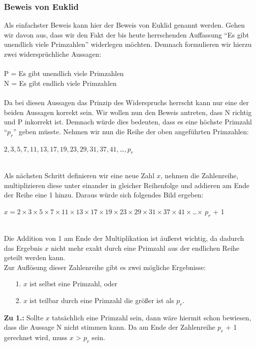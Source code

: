 \documentclass[german,12pt,a4paper]{article}
\begin{document}
\subsubsection{Beweis von Euklid}
Als einfachster Beweis kann hier der Beweis von Euklid genannt werden. Gehen wir davon aus, dass wir den Fakt der bis heute herrschenden Auffassung “Es gibt unendlich viele Primzahlen” widerlegen möchten. Demnach formulieren wir hierzu zwei widersprüchliche Aussagen:\\\\
\hspace*{20mm}P = Es gibt unendlich viele Primzahlen\\
\hspace*{20mm}N = Es gibt endlich viele Primzahlen\\
\\Da bei diesen Aussagen das Prinzip des Widerspruchs herrscht kann nur eine der beiden Aussagen korrekt sein. Wir wollen nun den Beweis antreten, dass N richtig und P inkorrekt ist. Demnach würde dies bedeuten, dass es eine höchste Primzahl “$p_r$” geben müsste. Nehmen wir nun die Reihe der oben angeführten Primzahlen:\\
\begin{center}
$2, 3, 5, 7, 11, 13, 17, 19, 23, 29, 31, 37, 41, $…$, p_r$
\end{center}\
\\Als nächsten Schritt definieren wir eine neue Zahl $x$, nehmen die Zahlenreihe, multiplizieren diese unter einander in gleicher Reihenfolge und addieren am Ende der Reihe eine 1 hinzu. Daraus würde sich folgendes Bild ergeben:\\
\begin{center}
$x = 2\times3\times5\times7\times11\times13\times17\times19\times23\times29\times31\times37\times41\times$…$\times$ $p_r$ + 1
\end{center}\
\\Die Addition von 1 am Ende der Multiplikation ist äußerst wichtig, da dadurch das Ergebnis $x$ nicht mehr exakt durch eine Primzahl aus der endlichen Reihe geteilt werden kann.\\
Zur Auflösung dieser Zahlenreihe gibt es zwei mögliche Ergebnisse:
\begin{itemize}
\item[1.] $x$ ist selbst eine Primzahl, oder
\item[2.] $x$ ist teilbar durch eine Primzahl die größer ist als $p_r$.
\end{itemize}
\textbf{Zu 1.:} Sollte $x$ tatsächlich eine Primzahl sein, dann wäre hiermit schon bewiesen, dass die Aussage N nicht stimmen kann. Da am Ende der Zahlenreihe $p_r$ + 1 gerechnet wird, muss $x$ > $p_r$ sein.\\\\
\end{document}
